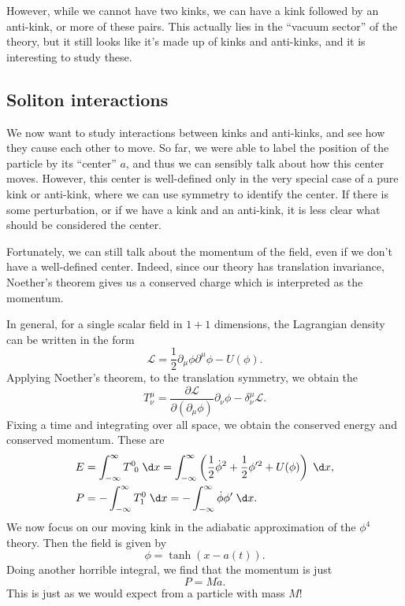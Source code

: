 \documentclass[a4paper]{article}
\begin{document}
However, while we cannot have two kinks, we can have a kink followed by an anti-kink, or more of these pairs. This actually lies in the ``vacuum sector'' of the theory, but it still looks like it's made up of kinks and anti-kinks, and it is interesting to study these.

\subsection{Soliton interactions}
We now want to study interactions between kinks and anti-kinks, and see how they cause each other to move. So far, we were able to label the position of the particle by its ``center'' $a$, and thus we can sensibly talk about how this center moves. However, this center is well-defined only in the very special case of a pure kink or anti-kink, where we can use symmetry to identify the center. If there is some perturbation, or if we have a kink and an anti-kink, it is less clear what should be considered the center.

Fortunately, we can still talk about the momentum of the field, even if we don't have a well-defined center. Indeed, since our theory has translation invariance, Noether's theorem gives us a conserved charge which is interpreted as the momentum.

In general, for a single scalar field in $1 + 1$ dimensions, the Lagrangian density can be written in the form
\[
  \mathcal{L} = \frac{1}{2} \partial_\mu \phi \partial^\mu \phi - U(\phi).
\]
Applying Noether's theorem, to the translation symmetry, we obtain the 
\[
  T^\mu_\nu = \frac{\partial \mathcal{L}}{\partial (\partial_\mu \phi)} \partial_\nu \phi - \delta^\mu_\nu \mathcal{L}.
\]
Fixing a time and integrating over all space, we obtain the conserved energy and conserved momentum. These are
\begin{align*}
  E &= \int_{-\infty}^\infty T^0\!_0 \;\d x = \int_{-\infty}^\infty \left(\frac{1}{2}\dot{\phi}^2 + \frac{1}{2} \phi'^2 + U(\phi)\right)\;\d x,\\
  P &= - \int_{-\infty}^\infty T^0_1 \;\d x = - \int_{-\infty}^\infty \dot{\phi} \phi' \;\d x.
\end{align*}
We now focus on our moving kink in the adiabatic approximation of the $\phi^4$ theory. Then the field is given by
\[
  \phi = \tanh (x - a(t)).
\]
Doing another horrible integral, we find that the momentum is just
\[
  P = M \dot{a}.
\]
This is just as we would expect from a particle with mass $M$!
\end{document}
